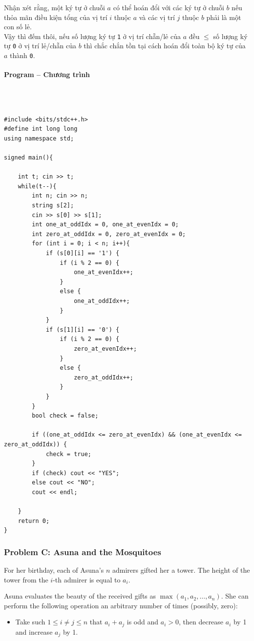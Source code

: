 \documentclass{article}
\begin{document}
Nhận xét rằng, một ký tự ở chuỗi $a$ có thể hoán đổi với các ký tự ở chuỗi $b$ nếu thỏa mãn điều kiện tổng của vị trí $i$ thuộc $a$ và các vị trí $j$ thuộc $b$ phải là một con số lẻ.\\

Vậy thì đếm thôi, nếu số lượng ký tự \texttt{1} ở vị trí chẵn/lẻ của $a$ đều $\leq$ số lượng ký tự \texttt{0} ở vị trí lẻ/chẵn của $b$ thì chắc chắn tồn tại cách hoán đổi toàn bộ ký tự của $a$ thành \texttt{0}.

\paragraph{Program -- Chương trình} \mbox{} \\

\begin{lstlisting}

#include <bits/stdc++.h>
#define int long long
using namespace std;

signed main(){

	int t; cin >> t;
	while(t--){
		int n; cin >> n;
		string s[2];
		cin >> s[0] >> s[1];
		int one_at_oddIdx = 0, one_at_evenIdx = 0;
		int zero_at_oddIdx = 0, zero_at_evenIdx = 0;
		for (int i = 0; i < n; i++){
			if (s[0][i] == '1') {
				if (i % 2 == 0) {
					one_at_evenIdx++;
				}
				else {
					one_at_oddIdx++;
				}
			}
			if (s[1][i] == '0') {
				if (i % 2 == 0) {
					zero_at_evenIdx++;
				}
				else {
					zero_at_oddIdx++;
				}
			}
		}
		bool check = false;

		if ((one_at_oddIdx <= zero_at_evenIdx) && (one_at_evenIdx <= zero_at_oddIdx)) {
			check = true;
		}
		if (check) cout << "YES";
		else cout << "NO";
		cout << endl;

	}
	return 0;
}
\end{lstlisting}

\subsubsection{Problem C: Asuna and the Mosquitoes}

For her birthday, each of Asuna's $n$ admirers gifted her a tower. The height of the tower from the $i$-th admirer is equal to $a_i$.

Asuna evaluates the beauty of the received gifts as $\max(a_1, a_2, \dots, a_n)$. She can perform the following operation an arbitrary number of times (possibly, zero):

\begin{itemize}
    \item Take such $1 \le i \ne j \le n$ that $a_i + a_j$ is odd and $a_i > 0$, then decrease $a_i$ by 1 and increase $a_j$ by 1.
\end{itemize}
\end{document}
